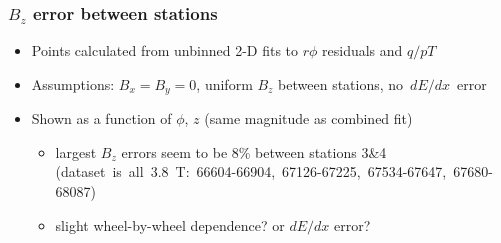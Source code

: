 \documentclass[compress]{beamer}
\begin{document}
\begin{frame}
\frametitle{$B_z$ error between stations }

\begin{itemize}
\item Points calculated from unbinned 2-D fits to $r\phi$ residuals and $q/pT$
\item Assumptions: $B_x = B_y = 0$, uniform $B_z$ between stations, \mbox{no $dE/dx$ error\hspace{-1 cm}}
\item Shown as a function of $\phi$, $z$ (same magnitude as combined fit)
\begin{itemize}
\item largest $B_z$ errors seem to be 8\% between stations 3\&4 \\ \mbox{\scriptsize (dataset is all 3.8~T: 66604-66904, 67126-67225, 67534-67647, 67680-68087)\hspace{-1 cm}}
\item slight wheel-by-wheel dependence?  or $dE/dx$ error?
\end{itemize}
\end{itemize}


\end{frame}
\end{document}
